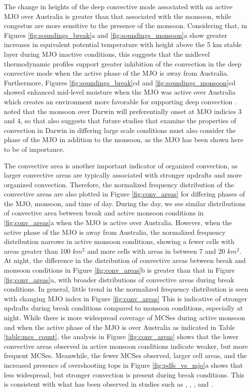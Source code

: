 \documentclass[journal abbreviation, manuscript]{copernicus}
\begin{document}
    The change in heights of the deep convective mode associated with an active MJO over Australia is greater than that associated with the monsoon, while congestus are more sensitive to the presence of the monsoon. Considering that, in Figures \ref{fig:soundings_break}a and \ref{fig:soundings_monsoon}a show greater increases in equivalent potential temperature with height above the 5 km stable layer during MJO inactive conditions, this suggests that the midlevel thermodynamic profiles support greater inhibition of the convection in the deep convective mode when the active phase of the MJO is away from Australia. Furthermore, Figures \ref{fig:soundings_break}cd and \ref{fig:soundings_monsoon}cd showed enhanced mid-level moisture when the MJO was active over Australia which creates an environment more favorable for supporting deep convection \citep{Hagosetal2013}. \cite{Evansetal2014} noted that the monsoon over Darwin will preferentially onset at MJO indicies 3 and 4, so that also suggests that future studies that examine the properties of convection in Darwin in differing large scale conditions must also consider the phase of the MJO in addition to the monsoon, as the MJO has been shown here to be of importance. 
    
    The convective area is another important indicator of organized convection, as larger convective areas are typically associated with stronger updrafts and more organized convection. Therefore, the normalized frequency distribution of the convective areas are also plotted in Figure \ref{fig:conv_areas} for differing phases of the MJO, monsoon, and time of day. During the day, we see similar distributions of convective area between break and active monsoon conditions in \ref{fig:conv_areas}a when the MJO is active over Australia. However, when the active phase of the MJO is away from Australia, the normalized frequency distribution narrows in active monsoon conditions, showing a fewer cells with areas greater than 100 $km^2$ and more cells with areas in between 7 and 20 $km^2$. At night, the difference in the distribution of convective areas between break and monsoon conditions in Figure \ref{fig:conv_areas}b is greater than that in Figure \ref{fig:conv_areas}a, with broader distributions of convective areas during break conditions. In general, little trend in the normalized frequency distribution is seen with changing MJO index in Figure \ref{fig:conv_areas} This is indicative of stronger updrafts during break conditions compared to monsoon conditions, especially at night. While there is more widespread coverage of MCSes during active monsoon and when the active phase of the MJO is over Australia as indicated in Table \ref{table:mcs_count}, the analysis in Figure \ref{fig:conv_areas} shows that the lower convective areas observed in active monsoon conditions indicate weaker, but more frequent MCSes. Meanwhile, the fewer MCSes observed, larger cell areas, and the increased presence of overshooting tops in Figure \ref{fig:pdfs_vs_mjo}a shows that less widespread, but stronger convection is present during break conditions. This is consistent with what has been observed in studies such as \cite{Rutledgeetal1992}, \cite{Williamsetal1992}, \cite{MayandRaj1999}, and \cite{MayandBallinger2006}. 
\end{document}
